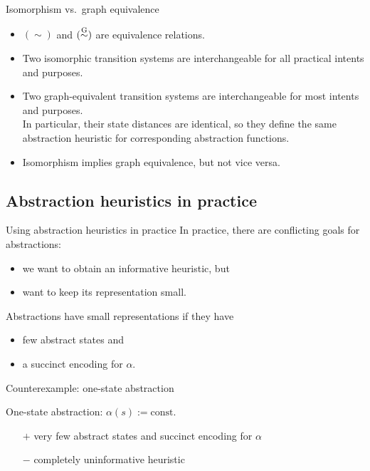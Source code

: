 \documentclass{gkibeamer}
\begin{document}
\begin{frame}{Isomorphism vs.\ graph equivalence}
  \begin{itemize}
  \item $(\sim)$ and $(\stackrel{\textup{G}}{\sim})$ are equivalence relations.
  \item Two isomorphic transition systems are interchangeable for all
    practical intents and purposes.
  \item Two graph-equivalent transition systems are interchangeable
    for most intents and purposes. \\ In particular, their state
    distances are identical, so they define the same abstraction
    heuristic for corresponding abstraction functions.
  \item Isomorphism implies graph equivalence, but not vice versa.
  \end{itemize}
\end{frame}

\subsection[Practice]{Abstraction heuristics in practice}

\begin{frame}{Using abstraction heuristics in practice}
  In practice, there are conflicting goals for abstractions:
  \begin{itemize}
  \item we want to obtain an \alert{informative heuristic}, but
  \item want to keep its \alert{representation small}.
  \end{itemize}

  \medskip

  Abstractions have small representations if they have
  \begin{itemize}
  \item \alert{few abstract states} and
  \item a \alert{succinct encoding for $\alpha$}.
  \end{itemize}
\end{frame}

\begin{frame}{Counterexample: one-state abstraction}
  \begin{center}
    \piconestateabstraction
  \end{center}

  \alert{One-state abstraction:} $\alpha(s) := \text{const}$.
  \begin{itemize}
  \item[$+$] \alert{very few abstract states}
    and \alert{succinct encoding for $\alpha$}
  \item[$-$] \alert{completely uninformative heuristic}
  \end{itemize}
\end{frame}
\end{document}
